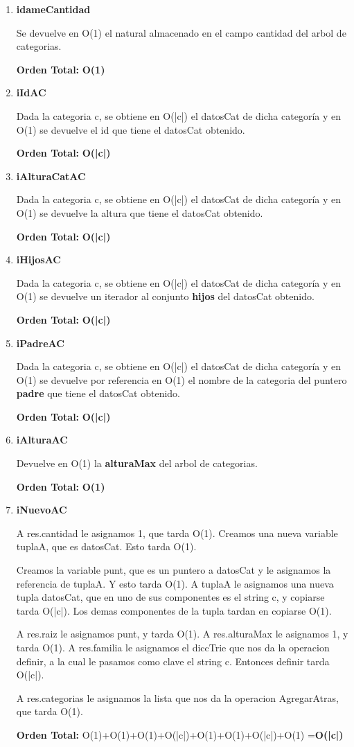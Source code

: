 \begin{enumerate}
\item\textbf{idameCantidad}
\par Se devuelve en O(1) el natural almacenado en el campo cantidad del arbol de categorias.
\par \textbf{Orden Total:} \textbf{O(1)}

\item\textbf{iIdAC}
\par Dada la categoria c, se obtiene en O(|c|) el datosCat de dicha categoría y en O(1) se devuelve el id que tiene el datosCat obtenido.
\par \textbf{Orden Total:} \textbf{O(|c|)}

\item\textbf{iAlturaCatAC}
\par Dada la categoria c, se obtiene en O(|c|) el datosCat de dicha categoría y en O(1) se devuelve la altura que tiene el datosCat obtenido.
\par \textbf{Orden Total:} \textbf{O(|c|)}

\item\textbf{iHijosAC}
\par Dada la categoria c, se obtiene en O(|c|) el datosCat de dicha categoría y en O(1) se devuelve un iterador al conjunto \textbf{hijos} del datosCat obtenido.
\par \textbf{Orden Total:} \textbf{O(|c|)}

\item\textbf{iPadreAC}
\par Dada la categoria c, se obtiene en O(|c|) el datosCat de dicha categoría y en O(1) se devuelve por referencia en O(1) el nombre de la categoria del puntero \textbf{padre} que tiene el datosCat obtenido.
\par \textbf{Orden Total:} \textbf{O(|c|)}

\item\textbf{iAlturaAC}
\par Devuelve en O(1) la \textbf{alturaMax} del arbol de categorias.
\par \textbf{Orden Total:} \textbf{O(1)}

\item\textbf{iNuevoAC}
\par A res.cantidad le asignamos 1, que tarda O(1). Creamos una nueva variable tuplaA, que es datosCat. Esto tarda O(1).
\par Creamos la variable punt, que es un puntero a datosCat y le asignamos la referencia de tuplaA. Y esto tarda O(1). A tuplaA le asignamos una nueva tupla datosCat, que en uno de sus componentes es el string c, y copiarse tarda O(|c|). Los demas componentes de la tupla tardan en copiarse O(1).
\par A res.raiz le asignamos punt, y tarda O(1). A res.alturaMax le asignamos 1, y tarda O(1). A res.familia le asignamos el diccTrie que nos da la operacion definir, a la cual le pasamos como clave el string c. Entonces definir tarda O(|c|).
\par A res.categorias le asignamos la lista que nos da la operacion AgregarAtras, que tarda O(1).
\par \textbf{Orden Total:} O(1)+O(1)+O(1)+O(|c|)+O(1)+O(1)+O(|c|)+O(1) =\textbf{O(|c|)}


\end{enumerate}
